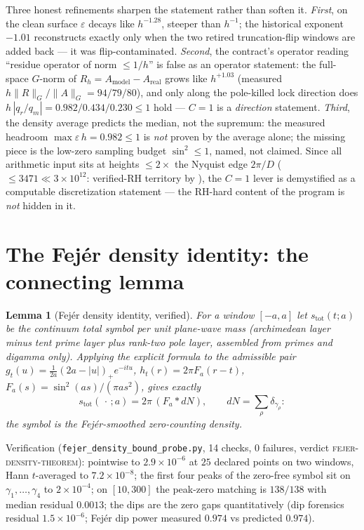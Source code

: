 \documentclass[11pt,a4paper]{article}
\newtheorem{lemma}[theorem]{Lemma}
\theoremstyle{remark}
\newcommand{\eps}{\varepsilon}
\begin{document}
Three honest refinements sharpen the statement rather than soften it.
\emph{First}, on the clean surface $\eps$ decays like $h^{-1.28}$,
steeper than $h^{-1}$; the historical exponent $-1.01$ reconstructs
exactly only when the two retired truncation-flip windows are added
back --- it was flip-contaminated.  \emph{Second}, the contract's
operator reading ``residue operator of norm $\le1/h$'' is false as an
operator statement: the full-space $G$-norm of $R_h=A_{\mathrm{model}}
-A_{\mathrm{real}}$ grows like $h^{+1.03}$ (measured
$h\lVert R\rVert_G/\lVert A\rVert_G=94/79/80$), and only along the
pole-killed lock direction does $h\,|q_r/q_m|=0.982/0.434/0.230\le1$
hold --- $C=1$ is a \emph{direction} statement.  \emph{Third}, the
density average predicts the median, not the supremum: the measured
headroom $\max\eps\,h=0.982\le1$ is \emph{not} proven by the average
alone; the missing piece is the low-zero sampling budget
$\sin^2\le1$, named, not claimed.  Since all arithmetic input sits at
heights $\le2\times$ the Nyquist edge $2\pi/D$
($\le3471\ll3\times10^{12}$: verified-RH territory by \cite{PT21}),
the $C=1$ lever is demystified as a computable discretization
statement --- the RH-hard content of the program is \emph{not} hidden
in it.

\section{The Fej\'er density identity: the connecting lemma}
\label{sec:fejer}

\begin{lemma}[Fej\'er density identity, verified]\label{lem:fejer}
For a window $[-a,a]$ let $s_{\mathrm{tot}}(t;a)$ be the continuum
total symbol per unit plane-wave mass (archimedean layer minus tent
prime layer plus rank-two pole layer, assembled from primes and
digamma only).  Applying the explicit formula to the admissible pair
$g_t(u)=\tfrac1{2a}(2a-|u|)_+e^{-itu}$,
$h_t(r)=2\pi F_a(r-t)$, $F_a(s)=\sin^2(as)/(\pi as^2)$, gives exactly
\begin{equation}\label{eq:fejerid}
s_{\mathrm{tot}}(\,\cdot\,;a)=2\pi\,(F_a\ast dN),\qquad
dN=\sum_\rho\delta_{\gamma_\rho}:
\end{equation}
the symbol \emph{is} the Fej\'er-smoothed zero-counting density.
\end{lemma}

Verification (\texttt{fejer\_density\_bound\_probe.py}, 14 checks, 0
failures, verdict \textsc{fejer-density-theorem}): pointwise to
$2.9\times10^{-6}$ at $25$ declared points on two windows, Hann
$t$-averaged to $7.2\times10^{-8}$; the first four peaks of the
zero-free symbol sit on $\gamma_1,\dots,\gamma_4$ to $2\times10^{-4}$;
on $[10,300]$ the peak-zero matching is $138/138$ with median residual
$0.0013$; the dips are the zero gaps quantitatively (dip forensics
residual $1.5\times10^{-6}$; Fej\'er dip power measured $0.974$ vs
predicted $0.974$).
\end{document}
